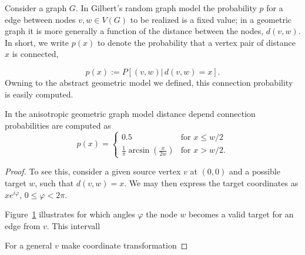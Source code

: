 Consider a graph $G$. In Gilbert's random graph model the probability
$p$ for a edge between nodes $v,w \in V(G)$ to be realized is a fixed
value; in a geometric graph it is more generally a function of the
distance between the nodes, $d(v,w)$. In short, we write $p(x)$ to
denote the probability that a vertex pair of distance $x$ is
connected,

\[p(x) := P\left[(v,w)|\,d(v,w)=x\right].\]
Owning to the abstract geometric model we defined, this connection
probability is easily computed.

\begin{proposition} %
In the anisotropic geometric graph model distance depend connection
probabilities are computed as 
\[
p(x) = \begin{cases} 0.5 & \mathrm{for} \,\, x\le w/2 \\
                       \frac{1}{\pi}
                       \operatorname{arcsin}(\frac{x}{2w}) &
                       \mathrm{for} \,\, x >
                       w/2. \end{cases}
\]
\end{proposition} 

\begin{proof}
  To see this, consider a given source vertex $v$ at $(0,0)$ and a
  possible target $w$, such that $d(v,w) = x$. We may then express the
  target coordinates as $x e^{i\varphi}$, $0 \le \varphi < 2\pi$.

  Figure~\ref{fig:geomtr_prb} illustrates for which angles
  $\varphi$ the node $w$ becomes a valid target for an edge from
  $v$. This intervall

  \begin{figure}[h] 
    \centering 
    \label{fig:geomtr_prb}
  \end{figure}

  For a general $v$ make coordinate transformation

\end{proof}

